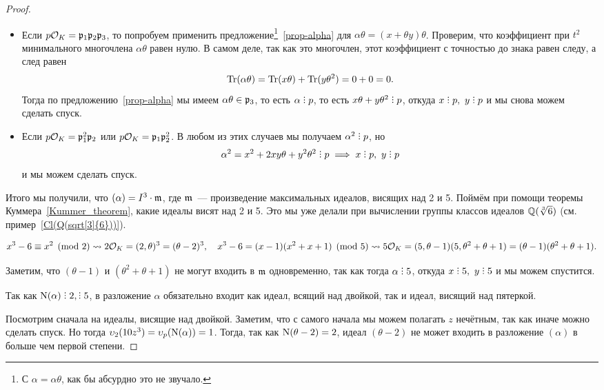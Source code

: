\begin{proof}
\begin{enumerate}
 		 		\begin{itemize}
 		 			\item Если $p\mathcal{O}_K = \mathfrak{p}_1 \mathfrak{p}_2 \mathfrak{p}_3$, то попробуем применить предложение\footnote{С $\alpha = \alpha \theta$, как бы абсурдно это не звучало.}~\ref{prop-alpha} для $\alpha \theta = (x + \theta y)\theta$.  Проверим, что коэффициент при $t^2$ минимального многочлена $\alpha \theta$ равен нулю. В самом деле, так как это многочлен, этот коэффициент с точностью до знака равен следу, а след равен 
 		 			\[
 		 			 	\operatorname{Tr}(\alpha \theta) = \operatorname{Tr}(x\theta) + \operatorname{Tr}(y\theta^2) = 0 + 0 = 0.
 		 			 \] 
 		 			Тогда по предложению~\ref{prop-alpha} мы имеем $\alpha \theta \in \mathfrak{p}_3$, то есть $\alpha \divby p$, то есть $x \theta + y \theta^2 \divby p$,  откуда $x \divby p, \ y \divby p$ и мы снова можем сделать спуск.  

 		 				\item Если $p\mathcal{O}_K = \mathfrak{p}_1^2 \mathfrak{p}_2$  или $p\mathcal{O}_K = \mathfrak{p}_1 \mathfrak{p}_2^2$. В любом из этих случаев мы получаем $\alpha^2 \divby p$, но
 		 				\[
 		 				 	\alpha^2 = x^2 + 2xy \theta + y^2 \theta^2 \divby p \implies x \divby p, \ y \divby p
 		 				 \] 
 		 				 и мы можем сделать спуск. 
 		 		\end{itemize}

	 		 \end{enumerate} 

	 		 Итого мы получили, что $(\alpha) = I^3 \cdot \mathfrak{m}$, где $\mathfrak{m}$~--- произведение максимальных идеалов, висящих над 2 и 5. Поймём при помощи теоремы Куммера~\ref{Kummer_theorem}, какие идеалы висят над 2 и 5. Это мы уже делали при вычислении группы классов идеалов $\mathbb{Q}(\sqrt[3]{6})$ (см. пример~\ref{Cl(Q(sqrt[3]{6}))}). 

	 		\[
	 			x^3 - 6 \equiv x^2 \pmod{2} \rightsquigarrow 2\mathcal{O}_K = (2, \theta)^3  = (\theta - 2)^3, \quad x^3 - 6 = (x - 1)(x^2 + x + 1) \pmod{5} \rightsquigarrow 5 \mathcal{O}_K = (5, \theta - 1)(5, \theta^2 + \theta + 1) = (\theta - 1)(\theta^2 + \theta + 1).
	 		\]

	 		Заметим, что $(\theta - 1)$ и $(\theta^2 + \theta + 1)$ не могут входить в $\mathfrak{m}$ одновременно, так как тогда $\alpha \divby 5$, откуда $x \divby 5, \ y \divby 5$ и мы можем спустится. 

	 		Так как $\Nm(\alpha) \divby 2, \divby 5$, в разложение $\alpha$ обязательно входит как идеал, всящий над двойкой, так и идеал, висящий над пятеркой. 

	 		Посмотрим сначала на идеалы, висящие над двойкой. Заметим, что с самого начала мы можем полагать $z$ нечётным, так как иначе можно сделать спуск. Но тогда $\v_{2}(10 z^3) = \v_{p}\lr*{\Nm(\alpha)} = 1$. Тогда, так как $\operatorname{\mathrm{N}}(\theta - 2) = 2$, идеал $(\theta - 2)$ не может входить в разложение $(\alpha)$ в больше чем первой степени. 


\end{proof}

